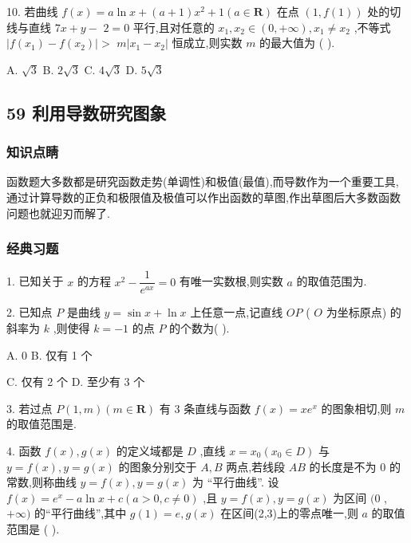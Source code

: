 10. 若曲线 $f\left( x\right)  = a\ln x + \left( {a + 1}\right) {x}^{2} + 1\left( {a \in  \mathbf{R}}\right)$ 在点 $\left( {1,f\left( 1\right) }\right)$ 处的切线与直线 ${7x} + y -$  $2 = 0$ 平行,且对任意的 ${x}_{1},{x}_{2} \in  \left( {0, + \infty }\right) ,{x}_{1} \neq  {x}_{2}$ ,不等式 $\left| {f\left( {x}_{1}\right)  - f\left( {x}_{2}\right) }\right|  >$  $m\left| {{x}_{1} - {x}_{2}}\right|$ 恒成立,则实数 $m$ 的最大值为 (   ).

A. $\sqrt{3}$ B. $2\sqrt{3}$ C. $4\sqrt{3}$ D. $5\sqrt{3}$

\subsection*{59 利用导数研究图象}

\subsubsection*{知识点睛}

函数题大多数都是研究函数走势(单调性)和极值(最值),而导数作为一个重要工具,通过计算导数的正负和极限值及极值可以作出函数的草图,作出草图后大多数函数问题也就迎刃而解了.

\subsubsection*{经典习题}

1. 已知关于 $x$ 的方程 ${x}^{2} - \dfrac{1}{{{e}}^{ax}} = 0$ 有唯一实数根,则实数 $a$ 的取值范围为\blkda{}.

2. 已知点 $P$ 是曲线 $y = \sin x + \ln x$ 上任意一点,记直线 ${OP}$ ( $O$ 为坐标原点) 的斜率为 $k$ ,则使得 $k =  - 1$ 的点 $P$ 的个数为(   ).

A. 0 B. 仅有 1 个

C. 仅有 2 个 D. 至少有 3 个

3. 若过点 $P\left( {1,m}\right) \left( {m \in  \mathbf{R}}\right)$ 有 3 条直线与函数 $f\left( x\right)  = x{{e}}^{x}$ 的图象相切,则 $m$ 的取值范围是\blkda{}.

4. 函数 $f\left( x\right) ,g\left( x\right)$ 的定义域都是 $D$ ,直线 $x = {x}_{0}\left( {{x}_{0} \in  D}\right)$ 与 $y = f\left( x\right) ,y = g\left( x\right)$ 的图象分别交于 $A,B$ 两点,若线段 ${AB}$ 的长度是不为 0 的常数,则称曲线 $y = f\left( x\right) ,y = g\left( x\right)$ 为 “平行曲线”. 设 $f\left( x\right)  = {{e}}^{x} - a\ln x + c\left( {a > 0,c \neq  0}\right)$ ,且 $y = f\left( x\right) ,y = g\left( x\right)$ 为区间 $(0$ , $+ \infty )$ 的“平行曲线”,其中 $g\left( 1\right)  = {e},g\left( x\right)$ 在区间(2,3)上的零点唯一,则 $a$ 的取值范围是 (   ).


